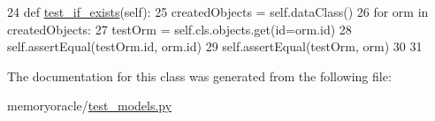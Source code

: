 \begin{DoxyCode}
24     \textcolor{keyword}{def }\hyperlink{classmemoryoracle_1_1test__models_1_1ModelTest_adbee10a2d47df4aee6ec8f4a396a3911}{test\_if\_exists}(self):
25         createdObjects = self.dataClass()
26         \textcolor{keywordflow}{for} orm \textcolor{keywordflow}{in} createdObjects:
27             testOrm = self.cls.objects.get(id=orm.id)
28             self.assertEqual(testOrm.id, orm.id)
29             self.assertEqual(testOrm, orm)
30 
31 
\end{DoxyCode}


The documentation for this class was generated from the following file\+:\begin{DoxyCompactItemize}
\item 
memoryoracle/\hyperlink{test__models_8py}{test\+\_\+models.\+py}\end{DoxyCompactItemize}
